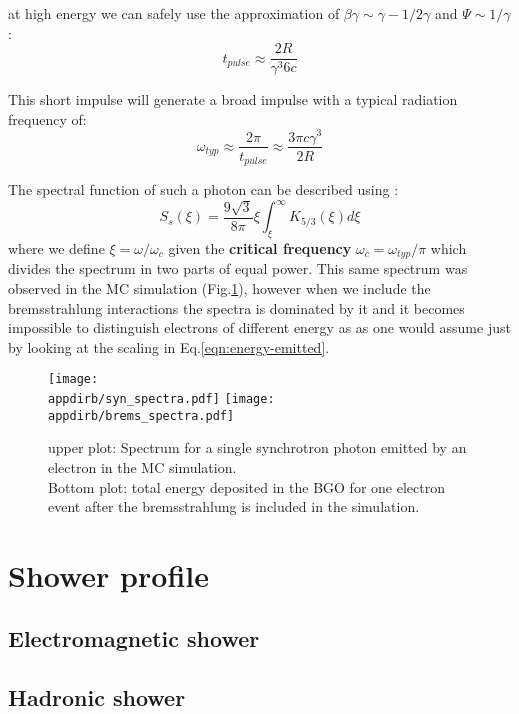 at high energy we can safely use the approximation of $\beta \gamma \sim \gamma - 1/2\gamma$ and $\Psi \sim 1/\gamma$:
\[t_{pulse} \approx \frac{2 R}{\gamma^3 6c}\]

This short impulse will generate a broad impulse with a typical radiation frequency of:
\[\omega_{typ} \approx \frac{2 \pi}{t_{pulse}} \approx \frac{3 \pi  c \gamma^3}{2 R} \]

The spectral function of such a photon can be described using \cite{synchrotron-radiation}:
\begin{equation}
\label{eqn:sync_spectrum}
S_s(\xi) = \frac{9 \sqrt{3}}{8 \pi}\xi \int_{\xi}^{\infty}K_{5/3}(\xi)d\xi
\end{equation}
where we define $\xi = \omega/\omega_c$ given the \textbf{critical frequency} $\omega_c =\omega_{typ}/\pi$ which divides the spectrum in two parts of equal power. This same spectrum was observed in the MC simulation (Fig.\ref{fig:synch_spectrum}), however when we include the bremsstrahlung interactions the spectra is dominated by it and it becomes impossible to distinguish electrons of different energy as as one would assume just by looking at the scaling in Eq.\ref{eqn:energy-emitted}.


\begin{figure}[h!]
\centering
\texttt{[image: \\appdirb/syn\_spectra.pdf]}
\texttt{[image: \\appdirb/brems\_spectra.pdf]}
\caption{upper plot: Spectrum for a single synchrotron photon emitted by an electron in the MC simulation. \\
Bottom plot: total energy deposited in the BGO for one electron event after the bremsstrahlung is included in the simulation.}
\label{fig:synch_spectrum}
\end{figure}

\section{Shower profile}
\label{appB:sec:shower-profile}

\subsection{Electromagnetic shower}
\label{appB:sec:shower-profile-ecal}

\subsection{Hadronic shower}
\label{appB:sec:shower-profile-hcal}

